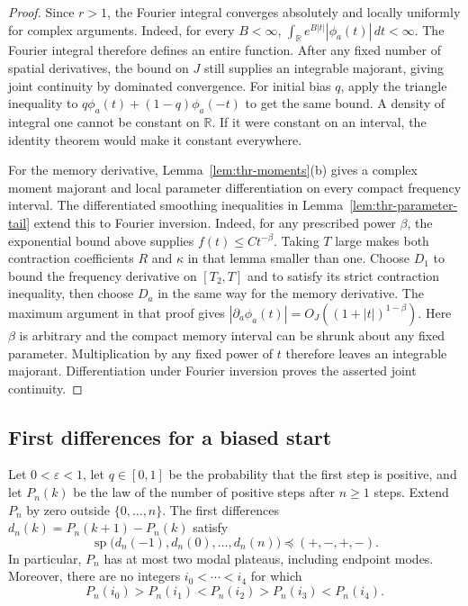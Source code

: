 \begin{proof}
Since $r>1$, the Fourier integral converges absolutely and locally
uniformly for complex arguments. Indeed, for every $B<\infty$,
$\int_{\mathbb R}e^{B|t|}|\phi_a(t)|\,dt<\infty$.
The Fourier integral therefore defines an entire function.
After any fixed number of spatial derivatives, the bound on $J$
still supplies an integrable majorant, giving joint continuity by
dominated convergence. For initial bias $q$, apply the triangle
inequality to $q\phi_a(t)+(1-q)\phi_a(-t)$ to get the same bound.
A density of integral one cannot be constant on $\mathbb R$.
If it were constant on an interval, the identity theorem would
make it constant everywhere.

For the memory derivative, Lemma~\ref{lem:thr-moments}(b) gives a
complex moment majorant and local parameter differentiation
on every compact frequency interval. The differentiated smoothing
inequalities in Lemma~\ref{lem:thr-parameter-tail} extend this to
Fourier inversion. Indeed, for any prescribed power $\beta$, the
exponential bound above supplies $f(t)\le Ct^{-\beta}$.
Taking $T$ large makes both contraction coefficients $R$ and $\kappa$
in that lemma smaller than one. Choose $D_1$ to bound the frequency
derivative on $[T_2,T]$ and to satisfy its strict contraction inequality,
then choose $D_a$ in the same way for the memory derivative.
The maximum argument in that proof gives
$|\partial_a\phi_a(t)|=O_J((1+|t|)^{1-\beta})$.
Here $\beta$ is arbitrary and the compact memory interval can be
shrunk about any fixed parameter. Multiplication by any fixed power
of $t$ therefore leaves an integrable majorant. Differentiation
under Fourier inversion proves the asserted joint continuity.
\end{proof}


\subsection{First differences for a biased start}

\begin{proposition}\label{prop:all-bias-modes}
Let $0<\varepsilon<1$, let $q\in[0,1]$ be the probability that the first
step is positive, and let $P_n(k)$ be the law of the number of positive
steps after $n\ge1$ steps. Extend $P_n$ by zero outside $\{0,\ldots,n\}$.
The first differences $d_n(k)=P_n(k+1)-P_n(k)$ satisfy
\[
 \operatorname{sp}\bigl(d_n(-1),d_n(0),\ldots,d_n(n)\bigr)
 \preceq (+,-,+,-).
\]
In particular, $P_n$ has at most two modal plateaus, including endpoint
modes. Moreover, there are no integers $i_0<\cdots<i_4$ for which
\[
 P_n(i_0)>P_n(i_1)<P_n(i_2)>P_n(i_3)<P_n(i_4).
\]
\end{proposition}

